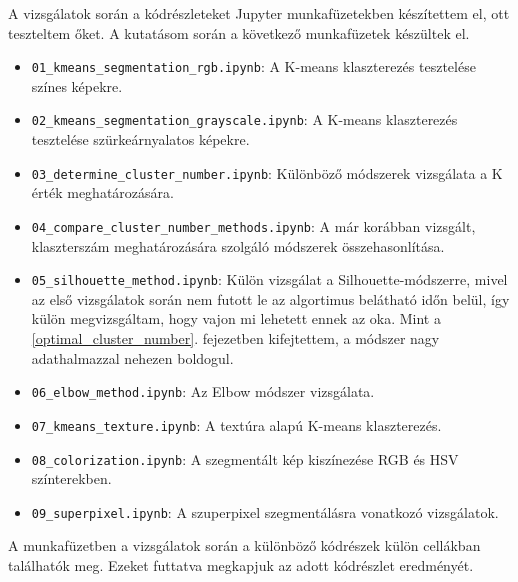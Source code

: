 A vizsgálatok során a kódrészleteket Jupyter munkafüzetekben készítettem el, ott teszteltem őket. A kutatásom során a következő munkafüzetek készültek el.
\begin{itemize}
\item \texttt{01\_kmeans\_segmentation\_rgb.ipynb}: A K-means klaszterezés tesztelése színes képekre.
\item \texttt{02\_kmeans\_segmentation\_grayscale.ipynb}: A K-means klaszterezés tesztelése szürkeárnyalatos képekre.
\item \texttt{03\_determine\_cluster\_number.ipynb}: Különböző módszerek vizsgálata a K érték meghatározására.
\item \texttt{04\_compare\_cluster\_number\_methods.ipynb}: A már korábban vizsgált, klaszterszám meghatározására szolgáló módszerek összehasonlítása.
\item \texttt{05\_silhouette\_method.ipynb}: Külön vizsgálat a Silhouette-módszerre, mivel az első vizsgálatok során nem futott le az algortimus belátható időn belül, így külön megvizsgáltam, hogy vajon mi lehetett ennek az oka. Mint a \ref{optimal_cluster_number}. fejezetben kifejtettem, a módszer nagy adathalmazzal nehezen boldogul.
\item \texttt{06\_elbow\_method.ipynb}: Az Elbow módszer vizsgálata.
\item \texttt{07\_kmeans\_texture.ipynb}: A textúra alapú K-means klaszterezés.
\item \texttt{08\_colorization.ipynb}: A szegmentált kép kiszínezése RGB és HSV színterekben.
\item \texttt{09\_superpixel.ipynb}: A szuperpixel szegmentálásra vonatkozó vizsgálatok. 
\end{itemize}

A munkafüzetben a vizsgálatok során a különböző kódrészek külön cellákban találhatók meg. Ezeket futtatva megkapjuk az adott kódrészlet eredményét. 